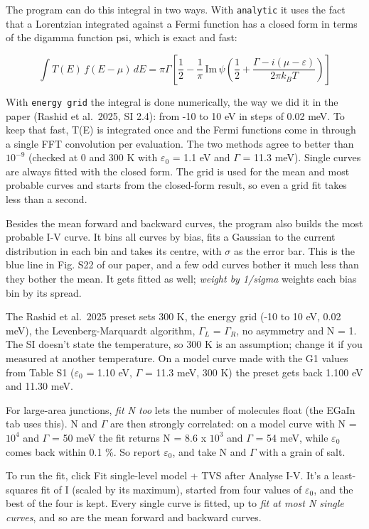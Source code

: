 \documentclass[
  11pt,
  a4paper,
]{article}
\begin{document}
The program can do this integral in two ways. With \texttt{analytic} it
uses the fact that a Lorentzian integrated against a Fermi function has
a closed form in terms of the digamma function psi, which is exact and
fast:

\[
\int T(E)\, f(E - \mu)\, dE = \pi\Gamma \left[\frac{1}{2} - \frac{1}{\pi}\, \mathrm{Im}\, \psi\!\left(\frac{1}{2} + \frac{\Gamma - i(\mu - \varepsilon)}{2\pi k_B T}\right)\right]
\]

With \texttt{energy grid} the integral is done numerically, the way we
did it in the paper (Rashid et al.~2025, SI 2.4): from -10 to 10 eV in
steps of 0.02 meV. To keep that fast, T(E) is integrated once and the
Fermi functions come in through a single FFT convolution per evaluation.
The two methods agree to better than $10^{-9}$ (checked at 0 and 300 K
with $\varepsilon_0$ = 1.1 eV and $\Gamma$ = 11.3 meV). Single curves
are always fitted with the closed form. The grid is used for the mean
and most probable curves and starts from the closed-form result, so even
a grid fit takes less than a second.

Besides the mean forward and backward curves, the program also builds
the most probable I-V curve. It bins all curves by bias, fits a Gaussian
to the current distribution in each bin and takes its centre, with
$\sigma$ as the error bar. This is the blue line in Fig. S22 of our
paper, and a few odd curves bother it much less than they bother the
mean. It gets fitted as well; \emph{weight by 1/sigma} weights each bias
bin by its spread.

The Rashid et al.~2025 preset sets 300 K, the energy grid (-10 to 10 eV,
0.02 meV), the Levenberg-Marquardt algorithm, $\Gamma_L$ = $\Gamma_R$,
no asymmetry and N = 1. The SI doesn't state the temperature, so 300 K
is an assumption; change it if you measured at another temperature. On a
model curve made with the G1 values from Table S1 ($\varepsilon_0$ =
1.10 eV, $\Gamma$ = 11.3 meV, 300 K) the preset gets back 1.100 eV and
11.30 meV.

For large-area junctions, \emph{fit N too} lets the number of molecules
float (the EGaIn tab uses this). N and $\Gamma$ are then strongly
correlated: on a model curve with N = $10^{4}$ and $\Gamma$ = 50 meV the
fit returns N = 8.6 x $10^{3}$ and $\Gamma$ = 54 meV, while
$\varepsilon_0$ comes back within 0.1 \%. So report $\varepsilon_0$, and
take N and $\Gamma$ with a grain of salt.

To run the fit, click Fit single-level model + TVS after Analyse I-V.
It's a least-squares fit of I (scaled by its maximum), started from four
values of $\varepsilon_0$, and the best of the four is kept. Every
single curve is fitted, up to \emph{fit at most N single curves}, and so
are the mean forward and backward curves.
\end{document}
